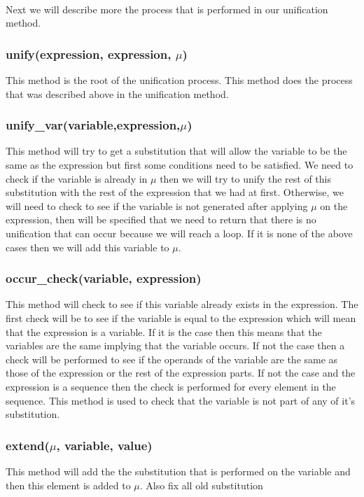 \paragraph*{}
Next we will describe more the process that is performed in our unification method.
\subsubsection{unify(expression, expression, $\mu$)}
This method is the root of the unification process. This method does the process that was described above in the unification method.
\subsubsection{unify\_var(variable,expression,$\mu$)}
This method will try to get a substitution that will allow the variable to be the same as the expression but first some conditions need to be satisfied. We need to check if the variable is already in $\mu$ then we will try to unify the rest of this substitution with the rest of the expression that we had at first. Otherwise, we will need to check to see if the variable is not generated after applying $\mu$ on the expression, then will be specified that we need to return that there is no unification that can occur because we will reach a loop. If it is none of the above cases then we will add this variable to $\mu$.
\subsubsection{occur\_check(variable, expression)}
This method will check to see if this variable already exists in the expression. The first check will be to see if the variable is equal to the expression which will mean that the expression is a variable. If it is the case then this means that the variables are the same implying that the variable occurs. If not the case then a check will be performed to see if the operands of the variable are the same as those of the expression or the rest of the expression parts. If not the case and the expression is a sequence then the check is performed for every element in the sequence. This method is used to check that the variable is not part of any of it's substitution.
\subsubsection{extend($\mu$, variable, value) }
This method will add the the substitution that is performed on the variable and then this element is added to $\mu$. Also fix all old substitution
